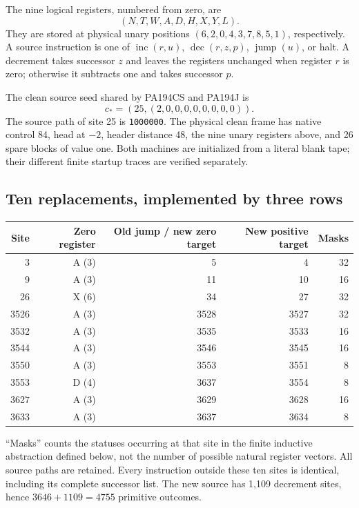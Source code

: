 \documentclass[11pt,letterpaper]{article}
\newcommand{\file}[1]{\texttt{\nolinkurl{#1}}}
\begin{document}
The nine logical registers, numbered from zero, are
\[
 (N,T,W,A,D,H,X,Y,L).
\]
They are stored at physical unary positions
\((6,2,0,4,3,7,8,5,1)\), respectively. A source instruction is one of
\(\operatorname{inc}(r,u)\), \(\operatorname{dec}(r,z,p)\),
\(\operatorname{jump}(u)\), or halt. A decrement takes successor \(z\)
and leaves the registers unchanged when register \(r\) is zero;
otherwise it subtracts one and takes successor \(p\).

The clean source seed shared by PA194CS and PA194J is
\[
 c_*=(25,(2,0,0,0,0,0,0,0,0)).
\]
The source path of site 25 is \file{1000000}. The physical clean frame
has native control 84, head at \(-2\), header distance 48, the nine unary
registers above, and 26 spare blocks of value one. Both machines are
initialized from a literal blank tape; their different finite startup
traces are verified separately.

\subsection{Ten replacements, implemented by three rows}

\begin{center}\small
\begin{tabular}{@{}rrrrr@{}}
\toprule
Site & Zero register & Old jump / new zero target & New positive target & Masks\\
\midrule
3 & A (3) & 5 & 4 & 32\\
9 & A (3) & 11 & 10 & 16\\
26 & X (6) & 34 & 27 & 32\\
3526 & A (3) & 3528 & 3527 & 32\\
3532 & A (3) & 3535 & 3533 & 16\\
3544 & A (3) & 3546 & 3545 & 16\\
3550 & A (3) & 3553 & 3551 & 8\\
3553 & D (4) & 3637 & 3554 & 8\\
3627 & A (3) & 3629 & 3628 & 16\\
3633 & A (3) & 3637 & 3634 & 8\\
\bottomrule
\end{tabular}
\end{center}

``Masks'' counts the statuses occurring at that site in the finite
inductive abstraction defined below, not the number of possible natural
register vectors. All source paths are retained. Every instruction
outside these ten sites is identical, including its complete successor
list. The new source has 1,109 decrement sites, hence
\(3646+1109=4755\) primitive outcomes.
\end{document}
